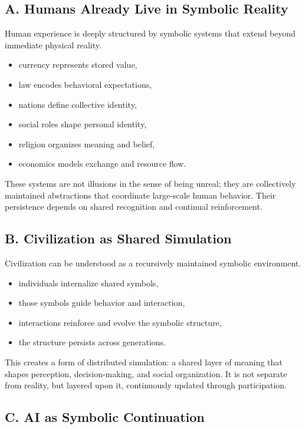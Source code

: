\documentclass[12pt]{article}
\begin{document}
\subsection*{A. Humans Already Live in Symbolic Reality}

Human experience is deeply structured by symbolic systems that extend beyond immediate physical reality.

\begin{itemize}
    \item currency represents stored value,
    \item law encodes behavioral expectations,
    \item nations define collective identity,
    \item social roles shape personal identity,
    \item religion organizes meaning and belief,
    \item economics models exchange and resource flow.
\end{itemize}

These systems are not illusions in the sense of being unreal; they are collectively maintained abstractions that coordinate large-scale human behavior. Their persistence depends on shared recognition and continual reinforcement.

\subsection*{B. Civilization as Shared Simulation}

Civilization can be understood as a recursively maintained symbolic environment.

\begin{itemize}
    \item individuals internalize shared symbols,
    \item those symbols guide behavior and interaction,
    \item interactions reinforce and evolve the symbolic structure,
    \item the structure persists across generations.
\end{itemize}

This creates a form of distributed simulation: a shared layer of meaning that shapes perception, decision-making, and social organization. It is not separate from reality, but layered upon it, continuously updated through participation.

\subsection*{C. AI as Symbolic Continuation}
\end{document}

